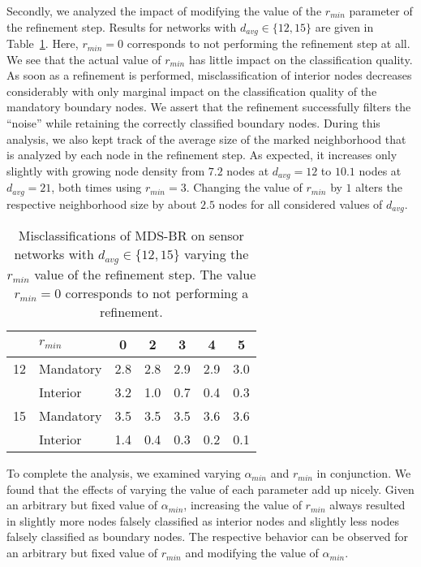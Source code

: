 \documentclass{llncs}
\begin{document}
Secondly, we analyzed the impact of modifying the value of the $r_{min}$ parameter of the refinement step. 
Results for networks with $d_{avg} \in \{12, 15\}$ are given in Table~\ref{tab:mdsbr_rmin}.
Here, $r_{min}=0$ corresponds to not performing the refinement step at all.
We see that the actual value of $r_{min}$ has little impact on the classification quality.
As soon as a refinement is performed, misclassification of interior nodes decreases considerably with only marginal impact on the classification quality of the mandatory boundary nodes.
We assert that the refinement successfully filters the ``noise'' while retaining the correctly classified boundary nodes.
During this analysis, we also kept track of the average size of the marked neighborhood that is analyzed by each node in the refinement step.
As expected, it increases only slightly with growing node density from $7.2$ nodes at $d_{avg}=12$ to $10.1$ nodes at $d_{avg}=21$, both times using $r_{min} = 3$.
Changing the value of $r_{min}$ by $1$ alters the respective neighborhood size by about $2.5$ nodes for all considered values of $d_{avg}$.

\begin{table}[tb]
\setlength\tabcolsep{5pt}
\centering
\caption{Misclassifications of MDS-BR on sensor networks with $d_{avg} \in \{12,15\}$ varying the $r_{min}$ value of the refinement step. The value $r_{min}=0$ corresponds to not performing a refinement.}\label{tab:mdsbr_rmin}
\begin{tabular}{cl||ccccc}
   & $r_{min}$ & 0 & 2 & 3 & 4 & 5 \\
\hline
12 & Mandatory & 2.8 & 2.8 & 2.9 & 2.9 & 3.0 \\
   & Interior  & 3.2 & 1.0 & 0.7 & 0.4 & 0.3 \\
15 & Mandatory & 3.5 & 3.5 & 3.5 & 3.6 & 3.6 \\
   & Interior  & 1.4 & 0.4 & 0.3 & 0.2 & 0.1
\end{tabular}
\end{table}

To complete the analysis, we examined varying $\alpha_{min}$ and $r_{min}$ in conjunction.
We found that the effects of varying the value of each parameter add up nicely.
Given an arbitrary but fixed value of $\alpha_{min}$, increasing the value of $r_{min}$ always resulted in slightly more nodes falsely classified as interior nodes and slightly less nodes falsely classified as boundary nodes.
The respective behavior can be observed for an arbitrary but fixed value of $r_{min}$ and modifying the value of $\alpha_{min}$.
\end{document}
